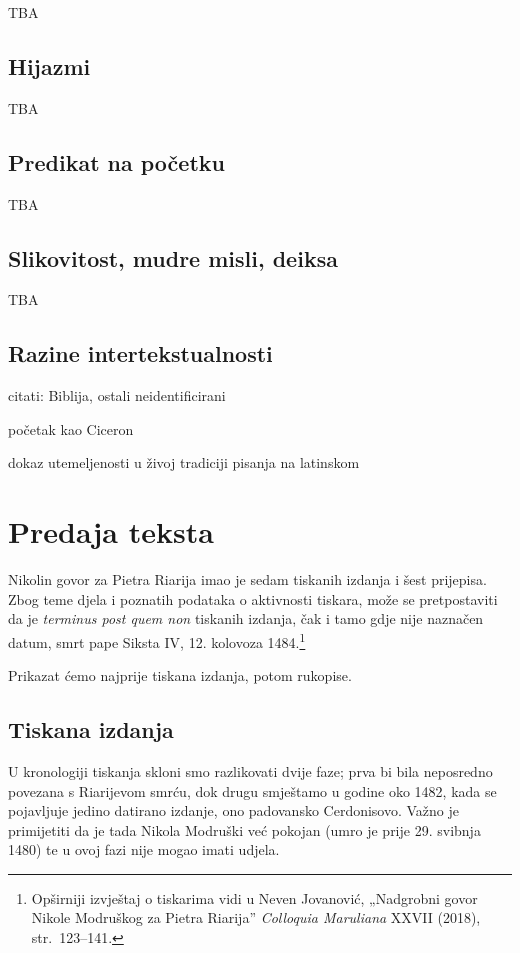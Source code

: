 \documentclass[a5paper,twoside]{article}
\begin{document}
TBA

\subsection{Hijazmi}

TBA


\subsection{Predikat na početku}

TBA

\subsection{Slikovitost, mudre misli, deiksa}

TBA

\subsection{Razine intertekstualnosti}

citati: Biblija, ostali neidentificirani

početak kao Ciceron

dokaz utemeljenosti u živoj tradiciji pisanja na latinskom

\section{Predaja teksta}

Nikolin govor za Pietra Riarija imao je sedam tiskanih izdanja i šest prijepisa.  Zbog teme djela i poznatih podataka o aktivnosti tiskara, može se pretpostaviti da je \textit{terminus post quem non} tiskanih izdanja, čak i tamo gdje nije naznačen datum, smrt pape Siksta IV, 12. kolovoza 1484.\footnote{Opširniji izvještaj o tiskarima vidi u Neven Jovanović, „Nadgrobni govor Nikole Modruškog za Pietra Riarija” \textit{Colloquia Maruliana} XXVII (2018), str.~123–141.}

Prikazat ćemo najprije tiskana izdanja, potom rukopise.

\subsection{Tiskana izdanja}

U kronologiji tiskanja skloni smo razlikovati dvije faze; prva bi bila neposredno povezana s Riarijevom smrću, dok drugu smještamo u godine oko 1482, kada se pojavljuje jedino datirano izdanje, ono padovansko Cerdonisovo. Važno je primijetiti da je tada Nikola Modruški već pokojan (umro je prije 29. svibnja 1480) te u ovoj fazi nije mogao imati udjela.
\end{document}
